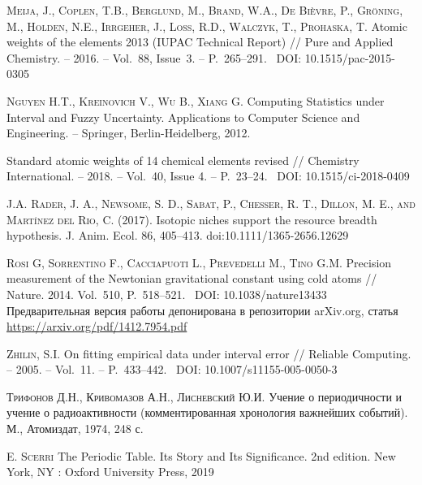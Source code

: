 \documentclass[a5paper,openany]{book}
\begin{document}
\begin{thebibliography}{00}
	\textsc{Meija, J., Coplen, T.B., Berglund, M., Brand, W.A., De Bièvre, P., 
		Gröning, M., Holden, N.E., Irrgeher, J., Loss, R.D., Walczyk, T., Prohaska, T.} 
	Atomic weights of the elements 2013 (IUPAC Technical Report) // Pure and Applied 
	Chemistry. -- 2016. -- Vol.~88, Issue~3. -- P.~265--291. \   DOI: 10.1515/pac-2015-0305 
	

	\textsc{Nguyen H.T., Kreinovich V., Wu B., Xiang G.} Computing Statistics 
	under Interval and Fuzzy Uncertainty. Applications to Computer Science and Engineering. 
	-- Springer, Berlin-Heidelberg, 2012. 
	
	Standard atomic weights of 14 chemical elements revised // Chemistry International. 
	-- 2018. -- Vol.~40, Issue 4. -- P.~23--24. \  DOI: 10.1515/ci-2018-0409 


	\textsc{J.A. Rader, J. A., Newsome, S. D., Sabat, P., Chesser, R. T., Dillon, M. E., and Martínez del Rio, C.} (2017). Isotopic niches support the resource breadth hypothesis. J. Anim. Ecol. 86, 405–413. doi:10.1111/1365-2656.12629
	
	\textsc{Rosi G, Sorrentino F., Cacciapuoti L., Prevedelli M., Tino G.M.} 
	Precision measurement of the Newtonian gravitational constant using cold atoms //  
	Nature. 2014. Vol.~510, P.~518--521. \  DOI: 10.1038/nature13433  \\   
	Предварительная версия работы депонирована в репозитории arXiv.org, статья 
	\url{https://arxiv.org/pdf/1412.7954.pdf}
	
	
	\textsc{Zhilin, S.I.} On fitting empirical data under interval error // 
	Reliable Computing. -- 2005. -- Vol.~11. -- P.~433--442. \ DOI: 10.1007/s11155-005-0050-3 
	

\textsc{Трифонов Д.Н., Кривомазов А.Н., Лисневский Ю.И.} Учение о периодичности и учение о радиоактивности (комментированная хронология важнейших событий). М., Атомиздат, 1974, 248 с.

\textsc{E. Scerri}
The Periodic Table. Its Story and Its Significance. 
2nd edition.  New York, NY : Oxford University Press, 2019 


\end{thebibliography}
\end{document}
